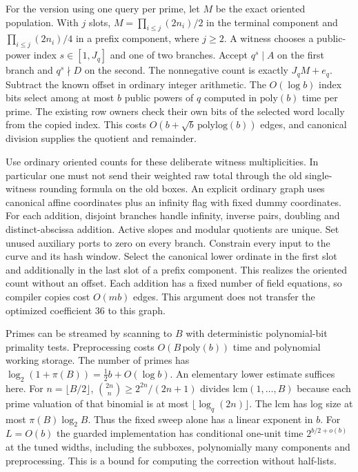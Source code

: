 \documentclass[11pt]{article}
\begin{document}
For the version using one query per prime, let $M$ be the exact
oriented population. With $j$ slots, $M=\prod_{i\le j}(2n_i)/2$ in
the terminal component and $\prod_{i\le j}(2n_i)/4$ in a prefix
component, where $j\ge2$. A witness chooses a public-power index
$s\in[1,J_q]$ and one of two branches. Accept $q^s\mid A$ on the
first branch and $q^s\nmid D$ on the second. The nonnegative count
is exactly $J_q M+e_q$. Subtract the known offset in ordinary
integer arithmetic. The $O(\log b)$ index bits select among at most
$b$ public powers of $q$ computed in $\mathrm{poly}(b)$ time per
prime. The existing row owners check their own bits of the selected
word locally from the copied index. This costs
$O(b+\sqrt b\,\mathrm{polylog}(b))$ edges, and canonical division
supplies the quotient and remainder.

Use ordinary oriented counts for these deliberate witness
multiplicities. In particular one must not send their weighted raw
total through the old single-witness rounding formula on the old
boxes. An explicit ordinary graph uses canonical affine coordinates
plus an infinity flag with fixed dummy coordinates. For each
addition, disjoint branches handle infinity, inverse pairs, doubling
and distinct-abscissa addition. Active slopes and modular quotients
are unique. Set unused auxiliary ports to zero on every branch.
Constrain every input to the curve and its hash window. Select the
canonical lower ordinate in the first slot and additionally in the
last slot of a prefix component. This realizes the oriented count
without an offset. Each addition has a fixed number of field
equations, so compiler copies cost $O(mb)$ edges. This argument
does not transfer the optimized coefficient 36 to this graph.

Primes can be streamed by scanning to $B$ with deterministic
polynomial-bit primality tests. Preprocessing costs
$O(B\,\mathrm{poly}(b))$ time and polynomial working storage.
The number of primes has $\log_2(1+\pi(B))=\tfrac12 b+O(\log b)$.
An elementary lower estimate suffices here. For $n=\lfloor B/2\rfloor$,
$\binom{2n}{n}\ge 2^{2n}/(2n+1)$ divides $\mathrm{lcm}(1,\dots,B)$
because each prime valuation of that binomial is at most
$\lfloor\log_q(2n)\rfloor$. The lcm has log size at most
$\pi(B)\log_2 B$. Thus the fixed sweep alone has a linear exponent
in $b$. For $L=O(b)$ the guarded implementation has conditional
one-unit time $2^{b/2+o(b)}$ at the tuned widths, including the
subboxes, polynomially many components and preprocessing. This is a
bound for computing the correction without half-lists.
\end{document}
